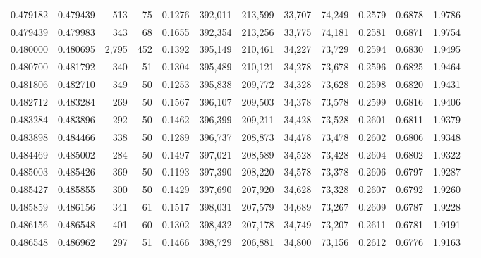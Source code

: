 \begin{tabular}{rrrrrrrrrrrrr}
0.479182 & 0.479439 &   513 &  75 &                                     0.1276 & 392,011 & 213,599 &  33,707 &  74,249 & 0.2579 & 0.6878 & 1.9786 \\
0.479439 & 0.479983 &   343 &  68 &                                     0.1655 & 392,354 & 213,256 &  33,775 &  74,181 & 0.2581 & 0.6871 & 1.9754 \\
0.480000 & 0.480695 & 2,795 & 452 &                                     0.1392 & 395,149 & 210,461 &  34,227 &  73,729 & 0.2594 & 0.6830 & 1.9495 \\
0.480700 & 0.481792 &   340 &  51 &                                     0.1304 & 395,489 & 210,121 &  34,278 &  73,678 & 0.2596 & 0.6825 & 1.9464 \\
0.481806 & 0.482710 &   349 &  50 &                                     0.1253 & 395,838 & 209,772 &  34,328 &  73,628 & 0.2598 & 0.6820 & 1.9431 \\
0.482712 & 0.483284 &   269 &  50 &                                     0.1567 & 396,107 & 209,503 &  34,378 &  73,578 & 0.2599 & 0.6816 & 1.9406 \\
0.483284 & 0.483896 &   292 &  50 &                                     0.1462 & 396,399 & 209,211 &  34,428 &  73,528 & 0.2601 & 0.6811 & 1.9379 \\
0.483898 & 0.484466 &   338 &  50 &                                     0.1289 & 396,737 & 208,873 &  34,478 &  73,478 & 0.2602 & 0.6806 & 1.9348 \\
0.484469 & 0.485002 &   284 &  50 &                                     0.1497 & 397,021 & 208,589 &  34,528 &  73,428 & 0.2604 & 0.6802 & 1.9322 \\
0.485003 & 0.485426 &   369 &  50 &                                     0.1193 & 397,390 & 208,220 &  34,578 &  73,378 & 0.2606 & 0.6797 & 1.9287 \\
0.485427 & 0.485855 &   300 &  50 &                                     0.1429 & 397,690 & 207,920 &  34,628 &  73,328 & 0.2607 & 0.6792 & 1.9260 \\
0.485859 & 0.486156 &   341 &  61 &                                     0.1517 & 398,031 & 207,579 &  34,689 &  73,267 & 0.2609 & 0.6787 & 1.9228 \\
0.486156 & 0.486548 &   401 &  60 &                                     0.1302 & 398,432 & 207,178 &  34,749 &  73,207 & 0.2611 & 0.6781 & 1.9191 \\
0.486548 & 0.486962 &   297 &  51 &                                     0.1466 & 398,729 & 206,881 &  34,800 &  73,156 & 0.2612 & 0.6776 & 1.9163 \\

\end{tabular}
